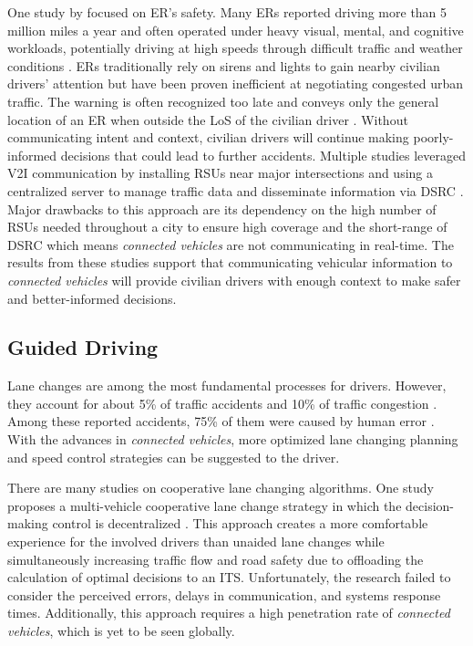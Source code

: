 One study by \cite{Buchenscheit2009} focused on \acrshort{ER}'s safety. Many \acrshort{ER}s reported driving more than 5 million miles a year and often operated under heavy visual, mental, and cognitive workloads, potentially driving at high speeds through difficult traffic and weather conditions \cite{Buchenscheit2009}. \acrshort{ER}s traditionally rely on sirens and lights to gain nearby civilian drivers' attention but have been proven inefficient at negotiating congested urban traffic. The warning is often recognized too late and conveys only the general location of an \acrshort{ER} when outside the \acrshort{LoS} of the civilian driver \cite{Buchenscheit2009}. Without communicating intent and context, civilian drivers will continue making poorly-informed decisions that could lead to further accidents. Multiple studies leveraged \acrshort{V2I} communication by installing \acrshort{RSU}s near major intersections and using a centralized server to manage traffic data and disseminate information via \acrshort{DSRC} \cite{Buchenscheit2009, Huang2009}. Major drawbacks to this approach are its dependency on the high number of \acrshort{RSU}s needed throughout a city to ensure high coverage and the short-range of \acrshort{DSRC} which means \textit{connected vehicles} are not communicating in real-time. The results from these studies support that communicating vehicular information to \textit{connected vehicles} will provide civilian drivers with enough context to make safer and better-informed decisions.


\subsection{Guided Driving}
Lane changes are among the most fundamental processes for drivers. However, they account for about 5\% of traffic accidents \cite{Ni2020} and 10\% of traffic congestion \cite{Ni2020}. Among these reported accidents, 75\% of them were caused by human error \cite{Ni2020}. With the advances in \textit{connected vehicles}, more optimized lane changing planning and speed control strategies can be suggested to the driver.

There are many studies on cooperative lane changing algorithms. One study proposes a multi-vehicle cooperative lane change strategy in which the decision-making control is decentralized \cite{Ni2020}. This approach creates a more comfortable experience for the involved drivers than unaided lane changes while simultaneously increasing traffic flow and road safety due to offloading the calculation of optimal decisions to an \acrshort{ITS}. Unfortunately, the research failed to consider the perceived errors, delays in communication, and systems response times. Additionally, this approach requires a high penetration rate of \textit{connected vehicles}, which is yet to be seen globally.

